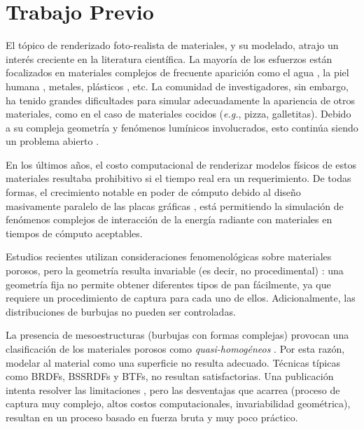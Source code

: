 \section{Trabajo Previo}
El tópico de renderizado foto-realista de materiales, y su modelado, atrajo un interés creciente en la literatura científica.
La mayoría de los esfuerzos están focalizados en materiales complejos de frecuente aparición como el agua \cite{Schechter2012}, la piel humana \cite{Donner2006}, metales, plásticos \cite{Kurt2010}, etc.
La comunidad de investigadores, sin embargo, ha tenido grandes dificultades para simular adecuadamente la apariencia de otros materiales, como en el caso de materiales cocidos ({\em e.g.}, pizza, galletitas).
Debido a su compleja geometría y fenómenos lumínicos involucrados, esto continúa siendo un problema abierto \cite{Voglsam2013}.

En los últimos años, el costo computacional de renderizar modelos físicos de estos materiales resultaba prohibitivo si el tiempo real era un requerimiento.
De todas formas, el crecimiento notable en poder de cómputo debido al diseño masivamente paralelo de las placas gráficas \cite{Yeo09,Harris06}, está permitiendo la simulación de fenómenos complejos de interacción de la energía radiante con materiales en tiempos de cómputo aceptables.


Estudios recientes utilizan consideraciones fenomenológicas sobre materiales porosos, pero la geometría resulta invariable (es decir, no procedimental) \cite{VanDyck2014}: una geometría fija no permite obtener diferentes tipos de pan fácilmente, ya que requiere un procedimiento de captura para cada uno de ellos.
Adicionalmente, las distribuciones de burbujas no pueden ser controladas.

La presencia de mesoestructuras (burbujas con formas complejas) provocan una clasificación de los materiales porosos como {\em quasi-homogéneos} \cite{Tong2005}. 
Por esta razón, modelar al material como una superficie no resulta adecuado.
Técnicas típicas como BRDFs, BSSRDFs \cite{Donner2009} y BTFs, no resultan satisfactorias.
Una publicación intenta resolver las limitaciones \cite{Tong2005}, pero las desventajas que acarrea (proceso de captura muy complejo, altos costos computacionales, invariabilidad geométrica), resultan en un proceso basado en fuerza bruta y muy poco práctico.

